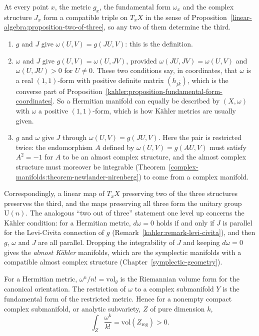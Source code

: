\begin{remark}\label{kahler:remark-two-of-three}
At every point $x$, the metric $g_x$, the fundamental form $\omega_x$ and the complex structure $J_x$ form a compatible triple on $T_xX$ in the sense of
Proposition~\ref{linear-algebra:proposition-two-of-three}, so any two of them determine the third.
\begin{enumerate}
\item $g$ and $J$ give $\omega(U, V) = g(JU, V)$: this is the definition.
\item $\omega$ and $J$ give $g(U, V) = \omega(U, JV)$, provided $\omega(JU, JV) = \omega(U, V)$ and $\omega(U, JU) > 0$ for $U \neq 0$. These two conditions say, in coordinates, that $\omega$ is a real
$(1,1)$-form with positive definite matrix $(h_{j\bar k})$, which is the converse part of Proposition~\ref{kahler:proposition-fundamental-form-coordinates}. So a Hermitian manifold can equally be
described by $(X, \omega)$ with $\omega$ a positive $(1,1)$-form, which is how K\"ahler metrics are usually given.
\item $g$ and $\omega$ give $J$ through $\omega(U, V) = g(JU, V)$. Here the pair is restricted twice: the endomorphism $A$ defined by $\omega(U, V) = g(AU, V)$ must satisfy $A^2 = -1$ for $A$ to be an almost
complex structure, and the almost complex structure must moreover be integrable (Theorem~\ref{complex-manifolds:theorem-newlander-nirenberg}) to come from a complex manifold.
\end{enumerate}
Correspondingly, a linear map of $T_xX$ preserving two of the three structures preserves the third, and the maps preserving all three form the unitary group $\mathrm{U}(n)$. The analogous ``two out of
three'' statement one level up concerns the K\"ahler condition: for a Hermitian metric, $d\omega = 0$ holds if and only if $J$ is parallel for the Levi-Civita connection of $g$
(Remark~\ref{kahler:remark-levi-civita}), and then $g$, $\omega$ and $J$ are all parallel. Dropping the integrability of $J$ and keeping $d\omega = 0$ gives the \emph{almost K\"ahler} manifolds, which are the symplectic manifolds with a
compatible almost complex structure (Chapter~\ref{symplectic-geometry}).
\end{remark}

\begin{proposition}\label{kahler:proposition-volume}
For a Hermitian metric, $\omega^n/n! = \mathrm{vol}_g$ is the Riemannian volume form for the canonical orientation. The restriction of $\omega$
to a complex submanifold $Y$ is the fundamental form of the restricted metric. Hence for a nonempty compact complex submanifold, or analytic
subvariety, $Z$ of pure dimension $k$,
\[
\int_Z\frac{\omega^k}{k!} = \mathrm{vol}(Z_{\mathrm{reg}}) > 0 .
\]
\end{proposition}

